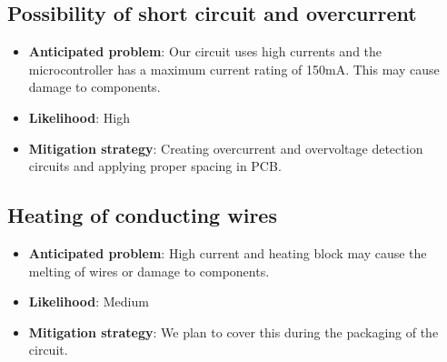 \documentclass{article}
\begin{document}
\subsection{Possibility of short circuit and overcurrent}
\begin{itemize}
    \item 
\textbf{Anticipated problem}: Our circuit uses high currents and the microcontroller has a maximum current rating of 150mA. This may cause damage to components.
\item \textbf{Likelihood}: High
\item \textbf{Mitigation strategy}: Creating overcurrent and overvoltage detection circuits and applying proper spacing in PCB.
\end{itemize}
\subsection{Heating of conducting wires}
\begin{itemize}
    \item 
\textbf{Anticipated problem}: High current and heating block may cause the melting of wires or damage to components.
\item \textbf{Likelihood}: Medium
\item \textbf{Mitigation strategy}: We plan to cover this during the packaging of the circuit.
\end{itemize}
\end{document}
